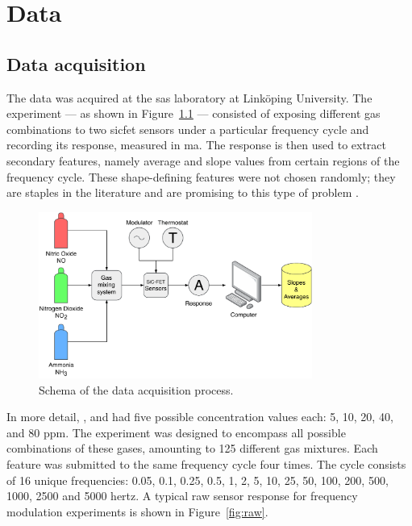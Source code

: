 \chapter{Data}
\label{cha:data}

\section{Data acquisition}
\label{sec:data-acquisition}

The data was acquired at the \acrfull{sas} laboratory at Linköping University. The experiment --- as shown in Figure~\ref{fig:experimental-setup} --- consisted of exposing different gas combinations to two \acrshort{sicfet} sensors under a particular frequency cycle and recording its response, measured in \acrfull{ma}. The response is then used to extract secondary features, namely average and slope values from certain regions of the frequency cycle. These shape-defining features were not chosen randomly; they are staples in the literature and are promising to this type of problem \parencite{Bastuck_2019} \parencite{Bur791934}.

\begin{figure}[!htb]
	\centering
	\includegraphics[width=0.8\textwidth]{../figures/experimental-setup.pdf}
	\caption{Schema of the data acquisition process.}
	\label{fig:experimental-setup}
\end{figure}

In more detail, ,  and  had five possible concentration values each: 5, 10, 20, 40, and 80 \acrfull{ppm}. The experiment was designed to encompass all possible combinations of these gases, amounting to 125 different gas mixtures. Each feature was submitted to the same frequency cycle four times. The cycle consists of 16 unique frequencies: 0.05, 0.1, 0.25, 0.5, 1, 2, 5, 10, 25, 50, 100, 200, 500, 1000, 2500 and 5000 \acrfull{hertz}. A typical raw sensor response for frequency modulation experiments is shown in Figure~\ref{fig:raw}.

